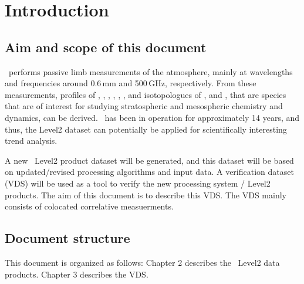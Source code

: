 \chapter{Introduction}
\label{chapter:introduction}


\setcounter{page}{1}


\section{Aim and scope of this document}
\label{sec:aim}
\smr\ performs passive limb measurements of the atmosphere,
mainly at wavelengths and frequencies around 0.6\,mm and 500\,GHz,
respectively.
From these measurements, profiles of 
, , , , 
, , and isotopologues of , and ,
that are species that are of interest for studying stratospheric and 
mesospheric chemistry and dynamics, can be derived. 
\smr\ has been in operation for approximately 14 years, and thus, the Level2
dataset can potentially be applied for scientifically interesting trend analysis.

A new \smr\ Level2 product dataset will be generated, and this dataset will be based
on updated/revised processing algorithms and input data.
A verification dataset (VDS) will be used as a tool to verify the new 
processing system / Level2 products.
The aim of this document is to describe this VDS.
The VDS mainly consists of colocated correlative measuerments.

\section{Document structure}

This document is organized as follows:
Chapter 2 describes the \smr\ Level2 data products.
Chapter 3 describes the VDS.



